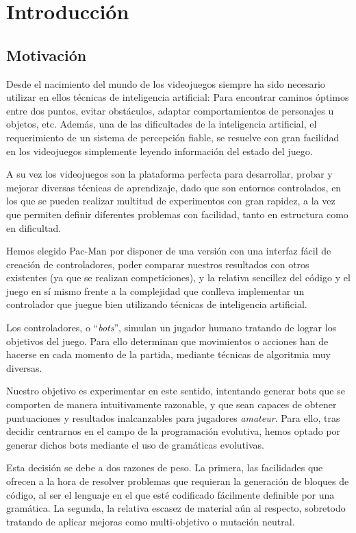 \chapter{Introducción} \label{cap:introduccion}

\section{Motivación}
Desde el nacimiento del mundo de los videojuegos siempre ha sido necesario utilizar en ellos técnicas de inteligencia artificial: Para encontrar caminos óptimos entre dos puntos, evitar obstáculos, adaptar comportamientos de personajes u objetos, etc. Además, una de las dificultades de la inteligencia artificial, el requerimiento de un sistema de percepción fiable, se resuelve con gran facilidad en los videojuegos simplemente leyendo información del estado del juego.

A su vez los videojuegos son la plataforma perfecta para desarrollar, probar y mejorar diversas técnicas de aprendizaje, dado que son entornos controlados, en los que se pueden realizar multitud de experimentos con gran rapidez, a la vez que permiten definir diferentes problemas con facilidad, tanto en estructura como en dificultad. 
 
Hemos elegido Pac-Man por disponer de una versión con una interfaz fácil de creación de controladores, poder comparar nuestros resultados con otros existentes (ya que se realizan competiciones), y la relativa sencillez del código y el juego en sí mismo frente a la complejidad que conlleva implementar un controlador que juegue bien utilizando técnicas de inteligencia artificial.
 
Los controladores, o ``\textit{bots}'', simulan un jugador humano tratando de lograr los objetivos del juego. Para ello determinan que movimientos o acciones han de hacerse en cada momento de la partida, mediante técnicas de algoritmia muy diversas.
 
Nuestro objetivo es experimentar en este sentido, intentando generar bots que se comporten de manera  intuitivamente razonable,  y que sean capaces de obtener puntuaciones y resultados inalcanzables para jugadores \textit{amateur}. Para ello, tras decidir centrarnos en el campo de la programación evolutiva, hemos optado por generar dichos bots mediante el uso de gramáticas evolutivas.

Esta decisión se debe a dos razones de peso. La primera, las facilidades que ofrecen a la hora de resolver problemas que requieran la generación de bloques de código, al ser el lenguaje en el que esté codificado fácilmente definible por una gramática. La segunda, la relativa escasez de material aún al respecto, sobretodo tratando de aplicar mejoras como multi-objetivo o mutación neutral.

